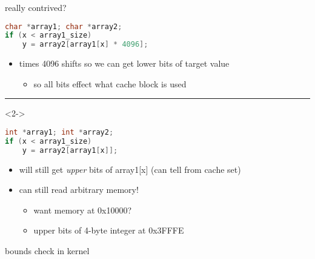\begin{frame}[fragile]{really contrived?}
\begin{lstlisting}[language=C,style=smaller]
char *array1; char *array2;
if (x < array1_size)
    y = array2[array1[x] * 4096];
\end{lstlisting}
\begin{itemize}
\item times 4096 shifts so we can get lower bits of target value
    \begin{itemize}
    \item so all bits effect what cache block is used
    \end{itemize}
\end{itemize}
\hrule
\begin{visibleenv}<2->
\begin{lstlisting}[language=C,style=smaller]
int *array1; int *array2;
if (x < array1_size)
    y = array2[array1[x]];
\end{lstlisting}
\begin{itemize}
\item will still get \textit{upper} bits of array1[x] (can tell from cache set)
\item<2-> can still read arbitrary memory!
    \begin{itemize}
    \item want memory at 0x10000?
    \item upper bits of 4-byte integer at 0x3FFFE
    \end{itemize}
\end{itemize}
\end{visibleenv}
\end{frame}

\begin{frame}[fragile]{bounds check in kernel}
\end{frame}
